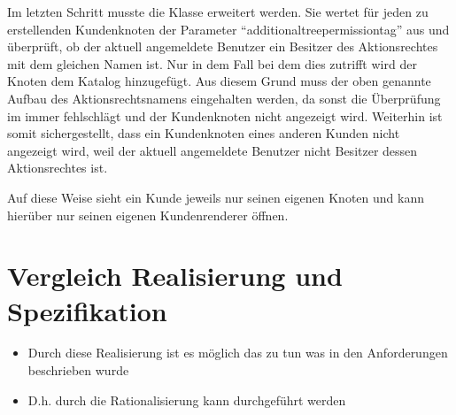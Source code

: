 Im letzten Schritt musste die Klasse  erweitert werden.
Sie wertet für jeden zu erstellenden Kundenknoten der Parameter "`additionaltreepermissiontag"' aus und überprüft, ob der aktuell angemeldete Benutzer ein Besitzer des Aktionsrechtes mit dem gleichen Namen ist.
Nur in dem Fall bei dem dies zutrifft wird der Knoten dem Katalog hinzugefügt.
Aus diesem Grund muss der oben genannte Aufbau des Aktionsrechtsnamens eingehalten werden, da sonst die Überprüfung im   immer fehlschlägt und der Kundenknoten nicht angezeigt wird.
Weiterhin ist somit sichergestellt, dass ein Kundenknoten eines anderen Kunden nicht angezeigt wird, weil der aktuell angemeldete Benutzer nicht Besitzer dessen Aktionsrechtes ist.

Auf diese Weise sieht ein Kunde jeweils nur seinen eigenen Knoten und kann hierüber nur seinen eigenen Kundenrenderer öffnen. 



\section{Vergleich Realisierung und Spezifikation}
\begin{itemize}
	\item Durch diese Realisierung ist es möglich das zu tun was in den Anforderungen beschrieben wurde
	\item D.h. durch die Rationalisierung kann durchgeführt werden
\end{itemize}